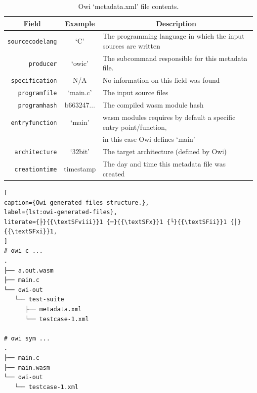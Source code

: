 \begin{table}[ht]
    \centering
    \begin{tabular}{r|c|l}
        \multicolumn{1}{c|}{Field} & \multicolumn{1}{c|}{Example} &\multicolumn{1}{c}{Description} \\
        \hline
        \hline
        \lstinline$sourcecodelang$ & `C' & The programming language in which the input sources are written \\
        \lstinline$producer$ & `owic' & The subcommand responsible for this metadata file.\\
        \lstinline$specification$ & N/A & No information on this field was found\\
        \lstinline$programfile$ & `main.c' & The input source files\\
        \lstinline$programhash$ & b663247... & The compiled wasm module hash\\
        \lstinline$entryfunction$ & `main' & \acrshort{wasm} modules requires by default a specific entry point/function,\\&& in this case Owi defines `main'\\
        \lstinline$architecture$ & `32bit' & The target architecture (defined by Owi)\\
        \lstinline$creationtime$ & timestamp & The day and time this metadata file was created\\
    \end{tabular}
    \caption{Owi `metadata.xml' file contents.}
    \label{tab:owi_c_owi_out}
\end{table}

\noindent
\begin{minipage}{\textwidth}
\begin{lstlisting}[
caption={Owi generated files structure.},
label={lst:owi-generated-files},
literate={├}{{\textSFviii}}1 {─}{{\textSFx}}1 {└}{{\textSFii}}1 {│}{{\textSFxi}}1,
]
# owi c ...
.
├── a.out.wasm
├── main.c
└── owi-out
   └── test-suite
      ├── metadata.xml
      └── testcase-1.xml

# owi sym ...
.
├── main.c
├── main.wasm 
└── owi-out
   └── testcase-1.xml
\end{lstlisting}
\end{minipage}
